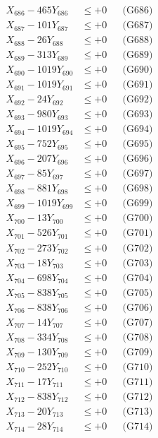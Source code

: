 \documentclass[a4paper,10pt]{article}
\begin{document}
{\begin{align}
X_{686} - 465Y_{686} &\leq +0 && \text{(G686)} \\
X_{687} - 101Y_{687} &\leq +0 && \text{(G687)} \\
X_{688} - 26Y_{688} &\leq +0 && \text{(G688)} \\
X_{689} - 313Y_{689} &\leq +0 && \text{(G689)} \\
X_{690} - 1019Y_{690} &\leq +0 && \text{(G690)} \\
\allowbreak
X_{691} - 1019Y_{691} &\leq +0 && \text{(G691)} \\
X_{692} - 24Y_{692} &\leq +0 && \text{(G692)} \\
X_{693} - 980Y_{693} &\leq +0 && \text{(G693)} \\
X_{694} - 1019Y_{694} &\leq +0 && \text{(G694)} \\
X_{695} - 752Y_{695} &\leq +0 && \text{(G695)} \\
X_{696} - 207Y_{696} &\leq +0 && \text{(G696)} \\
X_{697} - 85Y_{697} &\leq +0 && \text{(G697)} \\
X_{698} - 881Y_{698} &\leq +0 && \text{(G698)} \\
X_{699} - 1019Y_{699} &\leq +0 && \text{(G699)} \\
X_{700} - 13Y_{700} &\leq +0 && \text{(G700)} \\
\allowbreak
X_{701} - 526Y_{701} &\leq +0 && \text{(G701)} \\
X_{702} - 273Y_{702} &\leq +0 && \text{(G702)} \\
X_{703} - 18Y_{703} &\leq +0 && \text{(G703)} \\
X_{704} - 698Y_{704} &\leq +0 && \text{(G704)} \\
X_{705} - 838Y_{705} &\leq +0 && \text{(G705)} \\
X_{706} - 838Y_{706} &\leq +0 && \text{(G706)} \\
X_{707} - 14Y_{707} &\leq +0 && \text{(G707)} \\
X_{708} - 334Y_{708} &\leq +0 && \text{(G708)} \\
X_{709} - 130Y_{709} &\leq +0 && \text{(G709)} \\
X_{710} - 252Y_{710} &\leq +0 && \text{(G710)} \\
\allowbreak
X_{711} - 17Y_{711} &\leq +0 && \text{(G711)} \\
X_{712} - 838Y_{712} &\leq +0 && \text{(G712)} \\
X_{713} - 20Y_{713} &\leq +0 && \text{(G713)} \\
X_{714} - 28Y_{714} &\leq +0 && \text{(G714)} \\

\end{align}}
\end{document}

